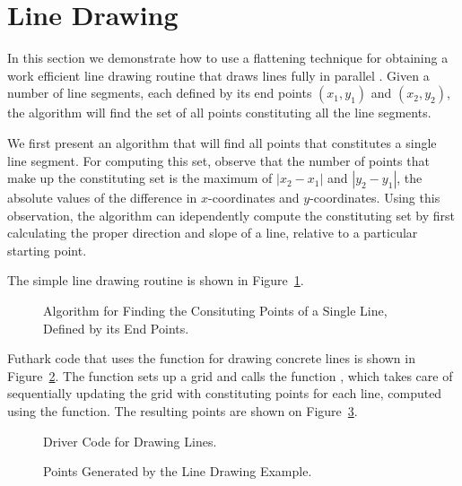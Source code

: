 \documentclass[oneside,11pt]{book}
\begin{document}
\section{Line Drawing}

In this section we demonstrate how to use a flattening technique for
obtaining a work efficient line drawing routine that draws lines fully
in parallel \cite{blelloch1990vector}. Given a number of line
segments, each defined by its end points $(x_1,y_1)$ and $(x_2,y_2)$,
the algorithm will find the set of all points constituting all the
line segments.

We first present an algorithm that will find all points that
constitutes a single line segment. For computing this set, observe
that the number of points that make up the constituting set is the
maximum of $|x_2-x_1|$ and $|y_2-y_1|$, the absolute values of the
difference in $x$-coordinates and $y$-coordinates. Using this
observation, the algorithm can idependently compute the constituting
set by first calculating the proper direction and slope of a line,
relative to a particular starting point.

The simple line drawing routine is shown in Figure~\ref{fig:linesseq}.

\begin{figure}
  
  \caption{Algorithm for Finding the Consituting Points of a Single Line, Defined by its End Points.}
  \label{fig:linesseq}
\end{figure}

Futhark code that uses the  function for drawing
concrete lines is shown in Figure~\ref{fig:linesdriver}. The function
 sets up a grid and calls the function , which
takes care of sequentially updating the grid with constituting points
for each line, computed using the  function. The
resulting points are shown on Figure~\ref{fig:lines}.

\begin{figure}
  
  \caption{Driver Code for Drawing Lines.}
  \label{fig:linesdriver}
\end{figure}

\begin{figure}
  \begin{center}

  \end{center}
\caption{Points Generated by the Line Drawing Example.}
\label{fig:lines}
\end{figure}
\end{document}
